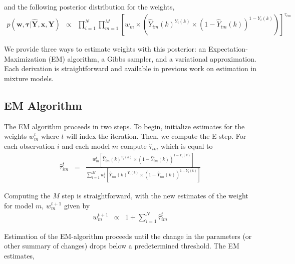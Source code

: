 \documentclass[12pt,letterpaper]{article}
\numberwithin{equation}{section}
\numberwithin{equation}{section}
\begin{document}
and the following posterior distribution for the weights, 
\begin{eqnarray}
p(\boldsymbol{w}, \boldsymbol{\tau} | \widehat{\boldsymbol{Y}}, \boldsymbol{x}, \boldsymbol{Y} ) & \propto & \prod_{i=1}^{N} \prod_{m=1}^{M} \left[w_{m} \times \left(\widehat{Y}_{im}(k)^{Y_{i} (k)} \times (1 - \widehat{Y}_{im}(k))^{1- Y_{i}(k) } \right) \right]^{\tau_{im}} \nonumber 
\end{eqnarray}

We provide three ways to estimate weights with this posterior: an Expectation-Maximization (EM) algorithm, a Gibbs sampler, and a variational approximation.  Each derivation is straightforward and available in previous work on estimation in mixture models.  

\subsection{EM Algorithm}
The EM algorithm proceeds in two steps.  To begin, initialize estimates for the weights $w_{m}^{t}$ where $t$ will index the iteration.  Then, we compute the E-step.  For each observation $i$ and each model $m$ compute $\widehat{\tau}_{im}$ which is equal to 
\begin{eqnarray} 
\widehat{\tau}_{im}^{t} & = & \frac{w_{m}^{t} \left[\widehat{Y}_{im}(k)^{Y_{i} (k)} \times (1 - \widehat{Y}_{im}(k))^{1- Y_{i}(k) }\right] } {\sum_{l = 1}^{M} w_{l}^{t} \left[\widehat{Y}_{im}(k)^{Y_{i} (k)} \times (1 - \widehat{Y}_{im}(k))^{1- Y_{i}(k) }\right]  } \nonumber 
\end{eqnarray}

Computing the $M$ step is straightforward, with the new estimates of the weight for model $m$, $w_{m}^{t + 1}$ given by 
\begin{eqnarray}
w_{m}^{t + 1} & \propto & 1 +  \sum_{i=1}^{N} \widehat{\tau}_{im}^{t} \nonumber
\end{eqnarray}

Estimation of the EM-algorithm proceeds until the change in the parameters (or other summary of changes) drops below a predetermined threshold.  The EM estimates, 
\end{document}
